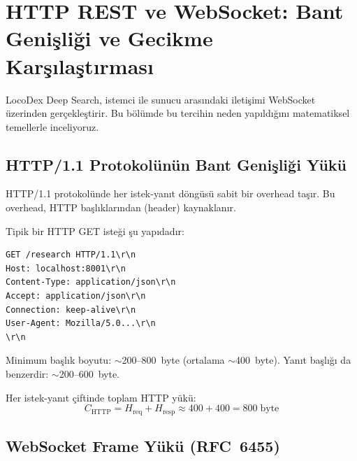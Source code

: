 

\section{HTTP REST ve WebSocket: Bant Geni\c{s}li\u{g}i ve Gecikme Kar\c{s}{\i}la\c{s}t{\i}rmas{\i}}
\label{sec:http-vs-ws}

LocoDex Deep Search, istemci ile sunucu aras{\i}ndaki ileti\c{s}imi WebSocket
\"{u}zerinden ger\c{c}ekle\c{s}tirir. Bu b\"{o}l\"{u}mde bu tercihin neden yap{\i}ld{\i}\u{g}{\i}n{\i}
matematiksel temellerle inceliyoruz.

\subsection{HTTP/1.1 Protokol\"{u}n\"{u}n Bant Geni\c{s}li\u{g}i Y\"{u}k\"{u}}
\label{sec:http-overhead}

HTTP/1.1 protokol\"{u}nde her istek-yan{\i}t d\"{o}ng\"{u}s\"{u} sabit bir overhead ta\c{s}{\i}r.
Bu overhead, HTTP ba\c{s}l{\i}klar{\i}ndan (header) kaynaklan{\i}r.

\begin{formulbox}
Tipik bir HTTP GET iste\u{g}i \c{s}u yap{\i}dad{\i}r:
\begin{lstlisting}
GET /research HTTP/1.1\r\n
Host: localhost:8001\r\n
Content-Type: application/json\r\n
Accept: application/json\r\n
Connection: keep-alive\r\n
User-Agent: Mozilla/5.0...\r\n
\r\n
\end{lstlisting}
Minimum ba\c{s}l{\i}k boyutu: $\sim$200--800~byte (ortalama $\sim$400~byte). Yan{\i}t ba\c{s}l{\i}\u{g}{\i} da benzerdir: $\sim$200--600~byte.
\end{formulbox}

Her istek-yan{\i}t \c{c}iftinde toplam HTTP y\"{u}k\"{u}:
\begin{equation}
\label{eq:http-overhead}
C_{\mathrm{HTTP}} = H_{\mathrm{req}} + H_{\mathrm{resp}} \approx 400 + 400 = 800 \;\text{byte}
\end{equation}

\subsection{WebSocket Frame Y\"{u}k\"{u} (RFC~6455)}
\label{sec:ws-frame-overhead}

